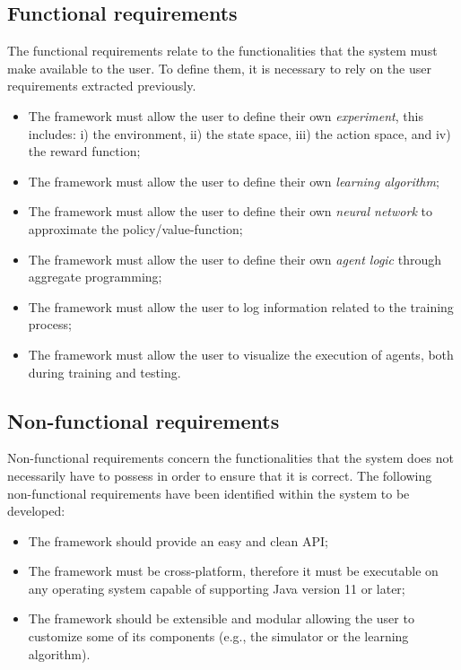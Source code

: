\documentclass[12pt,a4paper,openright,twoside]{book}
\begin{document}
\subsection*{Functional requirements}
The functional requirements relate to the functionalities that the system must make available to the user. 
    To define them, it is necessary to rely on the user requirements extracted previously.
\begin{itemize}
    \item The framework must allow the user to define their own \emph{experiment}, this includes: 
            i) the environment, 
            ii) the state space, 
            iii) the action space, and
            iv) the reward function;
    \item The framework must allow the user to define their own \emph{learning algorithm};
    \item The framework must allow the user to define their own \emph{neural network} to approximate the policy/value-function;
    \item The framework must allow the user to define their own \emph{agent logic} through aggregate programming;
    \item The framework must allow the user to log information related to the training process;
    \item The framework must allow the user to visualize the execution of agents, both during training and testing.
\end{itemize}

\subsection*{Non-functional requirements}
Non-functional requirements concern the functionalities that the system does not necessarily have to possess in order to ensure that it is correct.
The following non-functional requirements have been identified within the system to be developed:
\begin{itemize}
    \item The framework should provide an easy and clean API;
    \item The framework must be cross-platform, therefore it must be executable on any operating 
        system capable of supporting Java version 11 or later;
    \item The framework should be extensible and modular allowing the user to customize some of its 
        components (e.g., the simulator or the learning algorithm).
\end{itemize}
\end{document}
